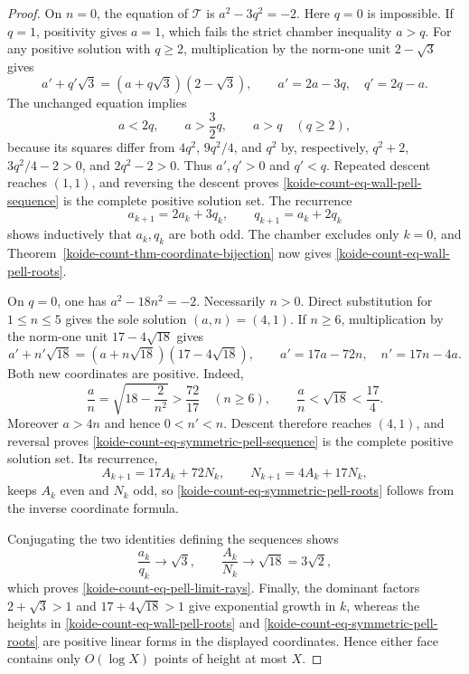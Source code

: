 \begin{proof}
On $n=0$, the equation of $\mathcal T$ is
$a^2-3q^2=-2$.  Here $q=0$ is impossible.  If $q=1$, positivity gives
$a=1$, which fails the strict chamber inequality $a>q$.  For any positive
solution with $q\geq2$, multiplication by the norm-one unit
$2-\sqrt3$ gives
\begin{equation}
 a'+q'\sqrt3=(a+q\sqrt3)(2-\sqrt3),\qquad
 a'=2a-3q,\quad q'=2q-a.
 \label{koide-count-eq-wall-pell-descent}
\end{equation}
The unchanged equation implies
\[
 a<2q,\qquad
 a>\frac32q,\qquad
 a>q
 \quad(q\geq2),
\]
because its squares differ from $4q^2$, $9q^2/4$, and $q^2$ by,
respectively, $q^2+2$, $3q^2/4-2>0$, and $2q^2-2>0$.
Thus $a',q'>0$ and $q'<q$.  Repeated descent reaches $(1,1)$, and reversing
the descent proves \eqref{koide-count-eq-wall-pell-sequence} is the complete
positive solution set.  The recurrence
\[
 a_{k+1}=2a_k+3q_k,\qquad q_{k+1}=a_k+2q_k
\]
shows inductively that $a_k,q_k$ are both odd.  The chamber excludes only
$k=0$, and Theorem~\ref{koide-count-thm-coordinate-bijection} now gives
\eqref{koide-count-eq-wall-pell-roots}.

On $q=0$, one has $a^2-18n^2=-2$.  Necessarily $n>0$.  Direct substitution
for $1\leq n\leq5$ gives the sole solution $(a,n)=(4,1)$.  If $n\geq6$,
multiplication by the norm-one unit $17-4\sqrt{18}$ gives
\begin{equation}
 a'+n'\sqrt{18}=(a+n\sqrt{18})(17-4\sqrt{18}),\qquad
 a'=17a-72n,\quad n'=17n-4a.
 \label{koide-count-eq-symmetric-pell-descent}
\end{equation}
Both new coordinates are positive.  Indeed,
\[
 \frac an=\sqrt{18-\frac2{n^2}}
 >\frac{72}{17}\quad(n\geq6),
 \qquad
 \frac an<\sqrt{18}<\frac{17}{4}.
\]
Moreover $a>4n$ and hence $0<n'<n$.  Descent therefore reaches $(4,1)$,
and reversal proves \eqref{koide-count-eq-symmetric-pell-sequence} is the
complete positive solution set.  Its recurrence,
\[
 A_{k+1}=17A_k+72N_k,\qquad
 N_{k+1}=4A_k+17N_k,
\]
keeps $A_k$ even and $N_k$ odd, so
\eqref{koide-count-eq-symmetric-pell-roots} follows from the inverse
coordinate formula.

Conjugating the two identities defining the sequences shows
\[
 \frac{a_k}{q_k}\longrightarrow\sqrt3,\qquad
 \frac{A_k}{N_k}\longrightarrow\sqrt{18}=3\sqrt2,
\]
which proves \eqref{koide-count-eq-pell-limit-rays}.  Finally, the dominant
factors $2+\sqrt3>1$ and $17+4\sqrt{18}>1$ give exponential growth in $k$,
whereas the heights in \eqref{koide-count-eq-wall-pell-roots} and
\eqref{koide-count-eq-symmetric-pell-roots} are positive linear forms in
the displayed coordinates.  Hence either face contains only $O(\log X)$
points of height at most $X$.
\end{proof}

